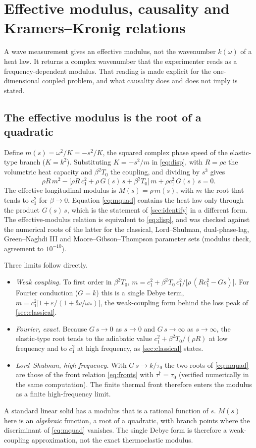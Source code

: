 \section{Effective modulus, causality and Kramers--Kronig relations}\label{sec:modulus}
A wave measurement gives an effective modulus, not the wavenumber $k(\omega)$ of a heat law. It returns a complex wavenumber that the experimenter reads as a frequency-dependent modulus. That reading is made explicit for the one-dimensional coupled problem, and what causality does and does not imply is stated.

\subsection{The effective modulus is the root of a quadratic}
Define $m(s)=\omega^2/K=-s^2/K$, the squared complex phase speed of the elastic-type branch ($K=k^2$). Substituting $K=-s^2/m$ in \eqref{eq:disp}, with $R=\rho c$ the volumetric heat capacity and $\beta^2T_0$ the coupling, and dividing by $s^3$ gives
\begin{equation}
\rho R\,m^2-\bigl[\rho R\,c_1^2+\rho\,G(s)\,s+\beta^2T_0\bigr]\,m+\rho c_1^2\,G(s)\,s=0 .\label{eq:mquad}
\end{equation}
The effective longitudinal modulus is $M(s)=\rho\,m(s)$, with $m$ the root that tends to $c_1^2$ for $\beta\to0$. Equation \eqref{eq:mquad} contains the heat law only through the product $G(s)\,s$, which is the statement of \cref{sec:identify} in a different form. The effective-modulus relation is equivalent to \eqref{eq:disp}, and was checked against the numerical roots of the latter for the classical, Lord--Shulman, dual-phase-lag, Green--Naghdi III and Moore--Gibson--Thompson parameter sets (modulus check, agreement to $10^{-10}$).

Three limits follow directly.
\begin{itemize}
\item \emph{Weak coupling.} To first order in $\beta^2T_0$, $m=c_1^2+\beta^2T_0\,c_1^2\big/\bigl[\rho\,(R c_1^2-G s)\bigr]$. For Fourier conduction ($G=k$) this is a single Debye term, $m=c_1^2\bigl[1+\varepsilon/(1+\ii\omega/\omega_*)\bigr]$, the weak-coupling form behind the loss peak of \cref{sec:classical}.
\item \emph{Fourier, exact.} Because $G\,s\to0$ as $s\to0$ and $G\,s\to\infty$ as $s\to\infty$, the elastic-type root tends to the adiabatic value $c_1^2+\beta^2T_0/(\rho R)$ at low frequency and to $c_1^2$ at high frequency, as \cref{sec:classical} states.
\item \emph{Lord--Shulman, high frequency.} With $G\,s\to k/\tau_0$ the two roots of \eqref{eq:mquad} are those of the front relation \eqref{eq:fronts} with $\tau^\dagger=\tau_0$ (verified numerically in the same computation). The finite thermal front therefore enters the modulus as a finite high-frequency limit.
\end{itemize}
A standard linear solid has a modulus that is a rational function of $s$. $M(s)$ here is an \emph{algebraic} function, a root of a quadratic, with branch points where the discriminant of \eqref{eq:mquad} vanishes. The single Debye form is therefore a weak-coupling approximation, not the exact thermoelastic modulus.

